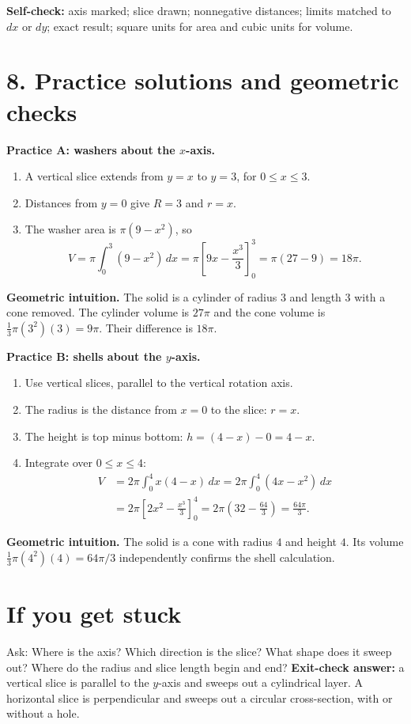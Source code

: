\documentclass[11pt,letterpaper]{article}
\newcommand{\topic}[1]{\section*{#1}}
\newcommand{\intuition}[1]{\par\textbf{Geometric intuition.} #1\par}
\begin{document}
\vspace{.3in}
\textbf{Self-check:} axis marked; slice drawn; nonnegative distances; limits matched to $dx$ or $dy$; exact result; square units for area and cubic units for volume.
\newpage
\topic{8. Practice solutions and geometric checks}
\textbf{Practice A: washers about the $x$-axis.}
\begin{enumerate}[leftmargin=*]
\item A vertical slice extends from $y=x$ to $y=3$, for $0\leq x\leq3$.
\item Distances from $y=0$ give $R=3$ and $r=x$.
\item The washer area is $\pi(9-x^2)$, so
\[
V=\pi\int_0^3(9-x^2)\,dx
=\pi\left[9x-\frac{x^3}{3}\right]_0^3
=\pi(27-9)=\boxed{18\pi}.
\]
\end{enumerate}
\intuition{The solid is a cylinder of radius $3$ and length $3$ with a cone removed. The cylinder volume is $27\pi$ and the cone volume is $\tfrac13\pi(3^2)(3)=9\pi$. Their difference is $18\pi$.}
\textbf{Practice B: shells about the $y$-axis.}
\begin{enumerate}[leftmargin=*]
\item Use vertical slices, parallel to the vertical rotation axis.
\item The radius is the distance from $x=0$ to the slice: $r=x$.
\item The height is top minus bottom: $h=(4-x)-0=4-x$.
\item Integrate over $0\leq x\leq4$:
\begin{align*}
V&=2\pi\int_0^4x(4-x)\,dx
=2\pi\int_0^4(4x-x^2)\,dx\\
 &=2\pi\left[2x^2-\frac{x^3}{3}\right]_0^4
 =2\pi\left(32-\frac{64}{3}\right)=\boxed{\frac{64\pi}{3}}.
\end{align*}
\end{enumerate}
\intuition{The solid is a cone with radius $4$ and height $4$. Its volume $\tfrac13\pi(4^2)(4)=64\pi/3$ independently confirms the shell calculation.}
\topic{If you get stuck}
Ask: Where is the axis? Which direction is the slice? What shape does it sweep out? Where do the radius and slice length begin and end?
\textbf{Exit-check answer:} a vertical slice is parallel to the $y$-axis and sweeps out a cylindrical layer. A horizontal slice is perpendicular and sweeps out a circular cross-section, with or without a hole.
\end{document}
